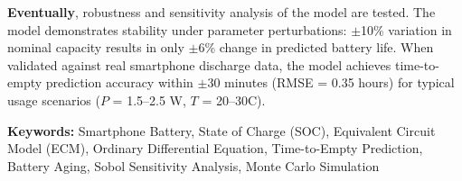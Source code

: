 \textbf{Eventually}, robustness and sensitivity analysis of the model are tested. The model demonstrates stability under parameter perturbations: $\pm$10\% variation in nominal capacity results in only $\pm$6\% change in predicted battery life. When validated against real smartphone discharge data, the model achieves time-to-empty prediction accuracy within $\pm$30 minutes (RMSE = 0.35 hours) for typical usage scenarios ($P$ = 1.5--2.5 W, $T$ = 20--30\textdegree C).

\vspace{0.5cm}
\textbf{Keywords:} Smartphone Battery, State of Charge (SOC), Equivalent Circuit Model (ECM), Ordinary Differential Equation, Time-to-Empty Prediction, Battery Aging, Sobol Sensitivity Analysis, Monte Carlo Simulation
